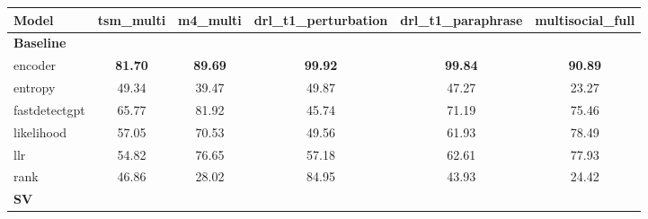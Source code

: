 \begin{tabular}{lccccc}
\toprule
Model & tsm\_multi & m4\_multi & drl\_t1\_perturbation & drl\_t1\_paraphrase & multisocial\_full \\
\midrule
\multicolumn{6}{l}{\textbf{Baseline}} \\
encoder & \textbf{81.70} & \textbf{89.69} & \textbf{99.92} & \textbf{99.84} & \textbf{90.89} \\
entropy & 49.34 & 39.47 & 49.87 & 47.27 & 23.27 \\
fastdetectgpt & 65.77 & 81.92 & 45.74 & 71.19 & 75.46 \\
likelihood & 57.05 & 70.53 & 49.56 & 61.93 & 78.49 \\
llr & 54.82 & 76.65 & 57.18 & 62.61 & 77.93 \\
rank & 46.86 & 28.02 & 84.95 & 43.93 & 24.42 \\
\midrule
\multicolumn{6}{l}{\textbf{SV}} \\
\bottomrule
\end{tabular}